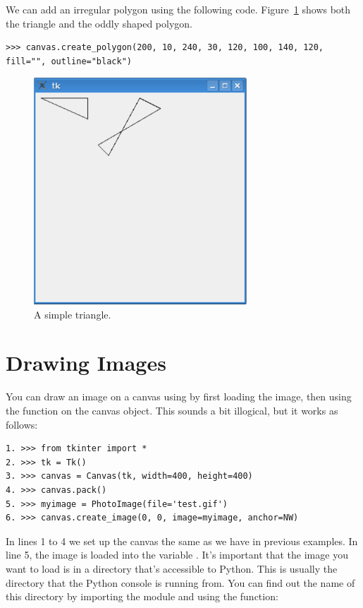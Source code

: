 We can add an irregular polygon using the following code. Figure~\ref{fig42} shows both the triangle and the oddly shaped polygon.

\begin{Verbatim}[frame=single]
>>> canvas.create_polygon(200, 10, 240, 30, 120, 100, 140, 120, fill="", outline="black")
\end{Verbatim}

\begin{figure}
\begin{center}
\includegraphics[width=80mm]{images/figure42}
\end{center}
\caption{A simple triangle.}\label{fig42}
\end{figure}

\section{Drawing Images}

You can draw an image on a canvas using  by first loading the image, then using the  function on the canvas object. This sounds a bit illogical, but it works as follows:

\begin{Verbatim}[frame=single]
1. >>> from tkinter import *
2. >>> tk = Tk()
3. >>> canvas = Canvas(tk, width=400, height=400)
4. >>> canvas.pack()
5. >>> myimage = PhotoImage(file='test.gif')
6. >>> canvas.create_image(0, 0, image=myimage, anchor=NW)
\end{Verbatim}

In lines 1 to 4 we set up the canvas the same as we have in previous examples. In line 5, the image is loaded into the variable . It's important that the image you want to load is in a directory that's accessible to Python. This is usually the directory that the Python console is running from. You can find out the name of this directory by importing the  module and using the  function:

